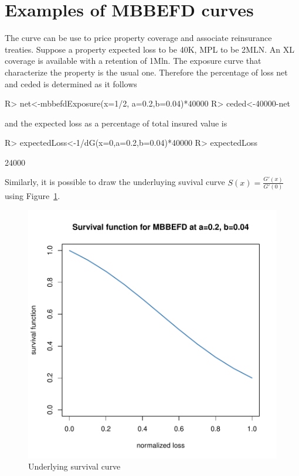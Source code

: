 \documentclass[article, nojss]{jss}
\begin{document}
\section{Examples of MBBEFD curves}\label{sec:examples}
The curve can be use to price property coverage and associate reinsurance treaties. Suppose a property expected loss to be 40K, MPL to be 2MLN. An XL coverage is available with a retention of 1Mln. The exposure curve that characterize the property is the usual one. Therefore the percentage of loss net and ceded is determined as it follows

\begin{Schunk}
\begin{Sinput}
R> net<-mbbefdExposure(x=1/2, a=0.2,b=0.04)*40000
R> ceded<-40000-net
\end{Sinput}
\end{Schunk}

and the expected loss as a percentage of total insured value is

\begin{Schunk}
\begin{Sinput}
R> expectedLoss<-1/dG(x=0,a=0.2,b=0.04)*40000
R> expectedLoss
\end{Sinput}
\begin{Soutput}
[1] 24000
\end{Soutput}
\end{Schunk}


Similarly, it is possible to draw the underluying suvival curve $S\left( x \right) = \frac{{G'\left( x \right)}}{{G'\left( 0 \right)}}$ using  Figure~\ref{fig:survival}.

\begin{figure}
\begin{center}
\includegraphics{mbbefd-survivalPlot}
\caption{Underlying survival curve}
\label{fig:survival}
\end{center}
\end{figure}
\end{document}
